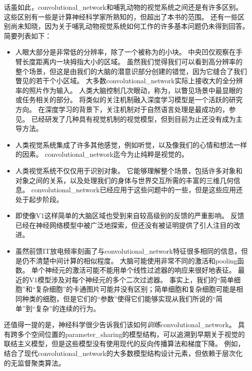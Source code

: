 话虽如此，\gls{convolutional_network}和哺乳动物的视觉系统之间还是有许多区别。
这些区别有一些是计算神经科学家所熟知的，但超出了本书的范围。
还有一些区别尚未知晓，因为关于哺乳动物视觉系统如何工作的许多基本问题仍未得到回答。
简要列表如下：
\begin{itemize}
  \item 人眼大部分是非常低的分辨率，除了一个被称为的小块。
  中央凹仅观察在手臂长度距离内一块拇指大小的区域。
  虽然我们觉得我们可以看到高分辨率的整个场景，但这是由我们的大脑的潜意识部分创建的错觉，因为它缝合了我们瞥见的若干个小区域。
  大多数\gls{convolutional_network}实际上接收大的全分辨率的照片作为输入。
  人类大脑控制几次眼动，称为，以瞥见场景中最显眼的或任务相关的部分。
  将类似的关注机制融入深度学习模型是一个活跃的研究方向。
  在深度学习的背景下，关注机制对于自然语言处理是最成功的，参见。
  已经研发了几种具有视觉机制的视觉模型，但到目前为止还没有成为主导方法\citep{Larochelle2010,Denil2012}。
  
  \item 人类视觉系统集成了许多其他感觉，例如听觉，以及像我们的心情和想法一样的因素。
  \gls{convolutional_network}迄今为止纯粹是视觉的。
  
  \item 人类视觉系统不仅仅用于识别对象。
  它能够理解整个场景，包括许多对象和对象之间的关系，以及处理我们的身体与世界交互所需的丰富的三维几何信息。
  \gls{convolutional_network}已经应用于这些问题中的一些，但是这些应用还处于起步阶段。
  
  \item 即使像V1这样简单的大脑区域也受到来自较高级别的反馈的严重影响。
  反馈已经在神经网络模型中被广泛地探索，但还没有被证明提供了引人注目的改进。
  
  \item 虽然前馈IT放电频率刻画了与\gls{convolutional_network}特征很多相同的信息，但是仍不清楚中间计算的相似程度。
  大脑可能使用非常不同的激活和\gls{pooling}函数。
  单个神经元的激活可能不能用单个线性过滤器的响应来很好地表征。
  最近的V1模型涉及对每个神经元的多个二次过滤器\citep{rust:2005}。
  事实上，我们的``简单细胞''和``复杂细胞''的卡通图片可能并没有区别；简单细胞和复杂细胞可能是相同种类的细胞，但是它们的``参数''使得它们能够实现从我们所说的``简单''到``复杂''的连续的行为。
\end{itemize}
 
 
还值得一提的是，神经科学很少告诉我们该如何\emph{训练}\gls{convolutional_network}。
具有跨多个空间位置的\gls{parameter_sharing}的模型结构，可以追溯到早期关于视觉的联结主义模型\citep{Marr76}，但是这些模型没有使用现代的反向传播算法和梯度下降。
例如，\citep{Fukushima80}结合了现代\gls{convolutional_network}的大多数模型结构设计元素，但依赖于层次化的无监督聚类算法。


